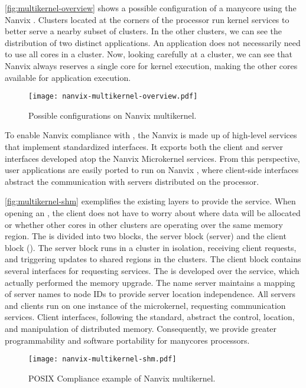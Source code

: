 		\autoref{fig:multikernel-overview} shows a possible configuration of a
		manycore using the Nanvix \multikernel.
		Clusters located at the corners of the processor run kernel services
		to better serve a nearby subset of clusters.
		In the other clusters, we can see the distribution of two distinct applications.
		An application does not necessarily need to use all cores in a cluster.
		Now, looking carefully at a cluster, we can see that Nanvix \microkernel
		always reserves a single core for kernel execution, making the other cores
		available for application execution.

		\begin{figure}[!tb]
			\centering%
			\caption{Possible configurations on Nanvix multikernel.}%
			\label{fig:multikernel-overview}%
			\texttt{[image: nanvix-multikernel-overview.pdf]}%
		\end{figure}

		To enable Nanvix \os compliance with \posix, the Nanvix \multikernel is
		made up of high-level \os services that implement standardized interfaces.
		It exports both the client and server interfaces developed atop	the
		Nanvix Microkernel services.
		From this perspective, user applications are easily ported to run on
		Nanvix \multikernel, where client-side interfaces abstract the communication
		with servers distributed on the processor.
		
		\autoref{fig:multikernel-shm} exemplifies the existing layers to provide
		the \shm service. When opening an \shm, the client does not have to worry
		about where data will be allocated or whether other cores in other clusters
		are operating over the same memory region.
		The \shm is divided into two blocks, the server block (\shm server) and the
		client block (\posix \shm). The server block runs in a cluster in isolation,
		receiving client requests, and triggering updates to shared regions in the
		clusters. The client block contains several interfaces for requesting services.
		The \shm is developed over the \rmem service, which actually performed
		the memory upgrade. The name server maintains a mapping of server names to
		node IDs to provide server location independence. All servers and clients
		run on one instance of the microkernel, \eg requesting communication services.
		Client interfaces, following the \posix standard, abstract the control,
		location, and manipulation of distributed memory.
		Consequently, we provide greater programmability and software portability
		for manycores processors.

		\begin{figure}[!tb]
			\centering%
			\caption{POSIX Compliance example of Nanvix multikernel.}%
			\label{fig:multikernel-shm}%
			\texttt{[image: nanvix-multikernel-shm.pdf]}%
		\end{figure}

